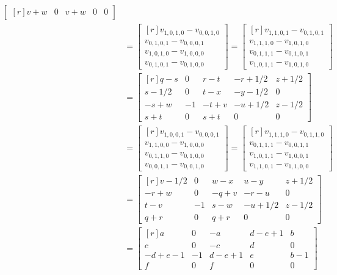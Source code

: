 \documentclass[12pt,titlepage]{article}
\numberwithin{equation}{section}
\begin{document}
\begin{align*}
\begin{bmatrix*}[r]
 v + w   &  0 &  v + w &      0   &       0
\end{bmatrix*}
\\
&= 
\begin{bmatrix*}[r]
v_{1,0,1,0} - v_{0,0,1,0} \\
v_{0,1,0,1} - v_{0,0,0,1} \\
v_{1,0,1,0} - v_{1,0,0,0} \\
v_{0,1,0,1} - v_{0,1,0,0}
\end{bmatrix*}
= 
\begin{bmatrix*}[r]
v_{1,1,0,1} - v_{0,1,0,1} \\
v_{1,1,1,0} - v_{1,0,1,0} \\
v_{0,1,1,1} - v_{0,1,0,1} \\
v_{1,0,1,1} - v_{1,0,1,0}
\end{bmatrix*}
\\
&=
\begin{bmatrix*}[r]
 q - s   &  0 &  r - t & -r + 1/2 & z + 1/2 \\
 s - 1/2 &  0 &  t - x & -y - 1/2 &       0 \\
-s + w   & -1 & -t + v & -u + 1/2 & z - 1/2 \\
 s + t   &  0 &  s + t &        0 &       0
\end{bmatrix*}
\\
&= 
\begin{bmatrix*}[r]
v_{1,0,0,1} - v_{0,0,0,1} \\
v_{1,1,0,0} - v_{1,0,0,0} \\
v_{0,1,1,0} - v_{0,1,0,0} \\
v_{0,0,1,1} - v_{0,0,1,0}
\end{bmatrix*}
= 
\begin{bmatrix*}[r]
v_{1,1,1,0} - v_{0,1,1,0} \\
v_{0,1,1,1} - v_{0,0,1,1} \\
v_{1,0,1,1} - v_{1,0,0,1} \\
v_{1,1,0,1} - v_{1,1,0,0}
\end{bmatrix*}
\\
&=
\begin{bmatrix*}[r]
 v - 1/2 &  0 &  w - x &  u - y   & z + 1/2 \\
-r + w   &  0 & -q + v & -r - u   &       0 \\
 t - v   & -1 &  s - w & -u + 1/2 & z - 1/2 \\
 q + r   &  0 &  q + r &        0 &       0
\end{bmatrix*}
\\
&=
\begin{bmatrix*}[r]
  a         &  0 & -a         & d - e + 1 & b     \\
  c         &  0 & -c         & d         &     0 \\
 -d + e - 1 & -1 &  d - e + 1 & e         & b - 1 \\ 
  f         &  0 &  f         &         0 &     0
\end{bmatrix*}
\end{align*}
\end{document}
